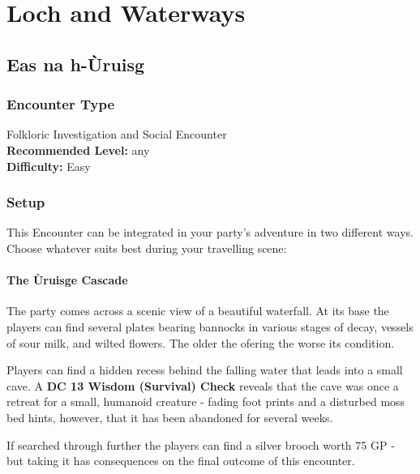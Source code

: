 \chapter*{Loch and Waterways}
\section*{Eas na h-Ùruisg}
\subsection*{Encounter Type}
{\entryfont Folkloric Investigation and Social Encounter\\
\textbf{Recommended Level:} any\\
\textbf{Difficulty:} Easy}
\subsection*{Setup}
{\entryfont This Encounter can be integrated in your party's adventure in two different ways. Choose whatever suits best during your travelling scene:}
\subsubsection*{The Ùruisge Cascade}
{\entryfont The party comes across a scenic view of a beautiful waterfall. At its base the players can find several plates bearing bannocks in various stages of decay, vessels of sour milk, and wilted flowers. The older the ofering the worse its condition.

Players can find a hidden recess behind the falling water that leads into a small cave. A \textbf{DC 13 Wisdom (Survival) Check} reveals that the cave was once a retreat for a small, humanoid creature - fading foot prints and a disturbed moss bed hints, however, that it has been abandoned for several weeks.

If searched through further the players can find a silver brooch worth 75 GP - but taking it has consequences on the final outcome of this encounter.}
